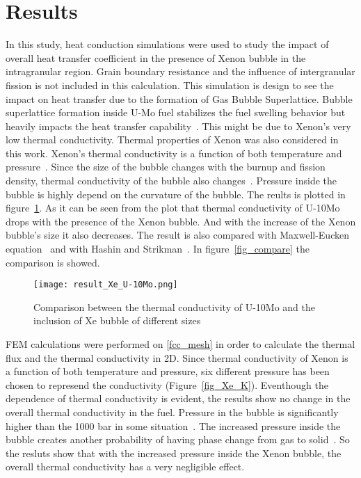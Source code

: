 \section{Results}
\begin{doublespacing}
In this study, heat conduction simulations were used to study the impact of overall heat transfer coefficient in the presence of Xenon bubble in the intragranular region. Grain boundary resistance and the influence of intergranular fission is not included in this calculation. This simulation is design to see the impact on heat transfer due to the formation of Gas Bubble Superlattice. Bubble superlattice formation inside U-Mo fuel stabilizes the fuel swelling behavior but heavily impacts the heat transfer capability~\cite{burkes2015thermal}. This might be due to Xenon's very low thermal conductivity. Thermal properties of Xenon was also considered in this work. Xenon's thermal conductivity is a function of both temperature and pressure~\cite{rabinovich1987thermophysical}. Since the size of the bubble changes with the burnup and fission density, thermal conductivity of the bubble also changes~\cite{miller2012advantages}. Pressure inside the bubble is highly depend on the curvature of the bubble. The reults is plotted in figure~\ref{fig_result}. As it can be seen from the plot that thermal conductivity of U-10Mo drops with the presence of the Xenon bubble. And with the increase of the Xenon bubble's size it also decreases. The result is also compared with Maxwell-Eucken equation~\cite{maxwell1881treatise} and with Hashin and Strikman~\cite{hashin1962variational}. In figure~\ref{fig_compare} the comparison is showed. 

\begin{figure}[H]
\centering
\texttt{[image: result\_Xe\_U-10Mo.png]}
\caption{Comparison between the thermal conductivity of U-10Mo and the inclusion of Xe bubble of different sizes}
\label{fig_result}
\end{figure}

FEM calculations were performed on \ref{fcc_mesh} in order to calculate the thermal flux and the thermal conductivity in 2D. Since thermal conductivity of Xenon is a function of both temperature and pressure, six different pressure has been chosen to represend the conductivity (Figure~\ref{fig_Xe_K}). Eventhough the dependence of thermal conductivity is evident, the results show no change in the overall thermal conductivity in the fuel. Pressure in the bubble is significantly higher than the 1000 bar in some situation~\cite{xiao2015atomistic}. The increased pressure inside the bubble creates another probability of having phase change from gas to solid~\cite{zheng2014thermodynamics}. So the resluts show that with the increased pressure inside the Xenon bubble, the overall thermal conductivity has a very negligible effect. 



\end{doublespacing}
